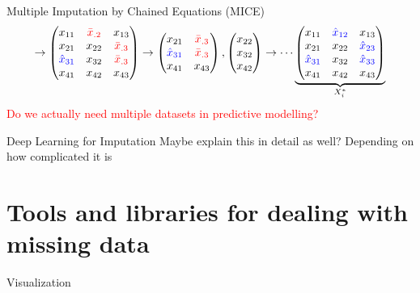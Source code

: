 \documentclass[aspectratio=43]{beamer}
\begin{document}
\begin{frame}{Multiple Imputation by Chained Equations (MICE)}
$$
\rightarrow
\begin{pmatrix}
x_{11} 		& \textcolor{red}{\bar{x}_{.2}} 	& x_{13} \\
x_{21} 		& x_{22} 		& \textcolor{red}{\bar{x}_{.3}} \\
\textcolor{blue}{\hat{x}_{31}} & x_{32} 	& \textcolor{red}{\bar{x}_{.3}} \\
x_{41} 		& x_{42} 	& x_{43} \\
\end{pmatrix}
\rightarrow
\begin{pmatrix}
x_{21} 		& \textcolor{red}{\bar{x}_{.3}} \\
\textcolor{blue}{\hat{x}_{31}} & \textcolor{red}{\bar{x}_{.3}} \\
x_{41} 		& x_{43} \\
\end{pmatrix},
\begin{pmatrix}
x_{22} \\
x_{32} \\
x_{42} \\
\end{pmatrix}
\rightarrow
\cdots
\underbrace{\begin{pmatrix}
x_{11} 		& \textcolor{blue}{\hat{x}_{12}} 	& x_{13} \\
x_{21} 		& x_{22} 		& \textcolor{blue}{\hat{x}_{23}} \\
\textcolor{blue}{\hat{x}_{31}} & x_{32} 	& \textcolor{blue}{\hat{x}_{33}} \\
x_{41} 		& x_{42} 	& x_{43} \\
\end{pmatrix}}_{X_i^{*}}
$$
\textcolor{red}{Do we actually need multiple datasets in predictive modelling?}
\end{frame}

\begin{frame}{Deep Learning for Imputation}
Maybe explain this in detail as well? Depending on how complicated it is
\end{frame}


\section{Tools and libraries for dealing with missing data}

\begin{frame}{Visualization}
\end{frame}
\end{document}
